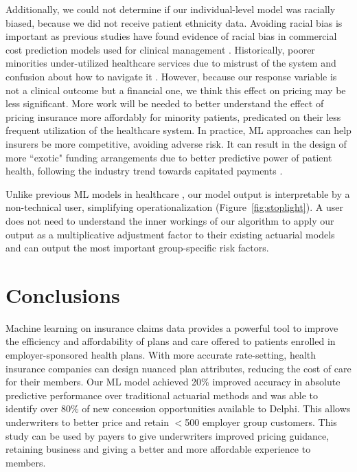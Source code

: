 \documentclass[letterpaper]{article} %
\begin{document}
Additionally, we could not determine if our individual-level model was racially biased, because we did not receive patient ethnicity data.  Avoiding racial bias is important as previous studies have found evidence of racial bias in commercial cost prediction models used for clinical management \cite{RacialBias}.  Historically, poorer minorities under-utilized healthcare services due to mistrust of the system and confusion about how to navigate it \cite{RacialBias}. However, because our response variable is not a clinical outcome but a financial one, we think this effect on pricing may be less significant.  More work will be needed to better understand the effect of pricing insurance more affordably for minority patients, predicated on their less frequent utilization of the healthcare system.  In practice, ML approaches can help insurers be more competitive, avoiding adverse risk. It can result in the design of more ``exotic" funding arrangements due to better predictive power of patient health, following the industry trend towards capitated payments \cite{mngdcare}.

Unlike previous ML models in healthcare \cite{xai}, our model output is interpretable by a non-technical user, simplifying operationalization (Figure~\ref{fig:stoplight}). A user does not need to understand the inner workings of our algorithm to apply our output as a multiplicative adjustment factor to their existing actuarial models and can output the most important group-specific risk factors.

\vspace{-0.93mm}
\section*{Conclusions}
Machine learning on insurance claims data provides a powerful tool to improve the efficiency and affordability of plans and care offered to patients enrolled in employer-sponsored health plans. With more accurate rate-setting, health insurance companies can design nuanced plan attributes, reducing the cost of care for their members. Our ML model achieved 20\% improved accuracy in absolute predictive performance over traditional actuarial methods and was able to identify over 80\% of new concession opportunities available to Delphi. This allows underwriters to better price and retain $<$500 employer group customers. This study can be used by payers to give underwriters improved pricing guidance, retaining business and giving a better and more affordable experience to members.
\end{document}
